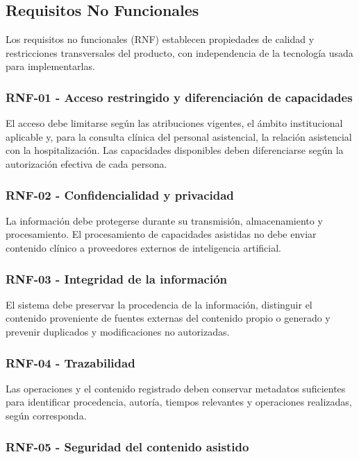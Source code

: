 \subsection{Requisitos No Funcionales}

Los requisitos no funcionales (RNF) establecen propiedades de calidad y restricciones transversales del producto, con independencia de la tecnología usada para implementarlas.

\subsubsection*{\textbf{RNF-01} - Acceso restringido y diferenciación de capacidades}

El acceso debe limitarse según las atribuciones vigentes, el ámbito institucional aplicable y, para la consulta clínica del personal asistencial, la relación asistencial con la hospitalización. Las capacidades disponibles deben diferenciarse según la autorización efectiva de cada persona.

\subsubsection*{\textbf{RNF-02} - Confidencialidad y privacidad}

La información debe protegerse durante su transmisión, almacenamiento y procesamiento. El procesamiento de capacidades asistidas no debe enviar contenido clínico a proveedores externos de inteligencia artificial.

\subsubsection*{\textbf{RNF-03} - Integridad de la información}

El sistema debe preservar la procedencia de la información, distinguir el contenido proveniente de fuentes externas del contenido propio o generado y prevenir duplicados y modificaciones no autorizadas.

\subsubsection*{\textbf{RNF-04} - Trazabilidad}

Las operaciones y el contenido registrado deben conservar metadatos suficientes para identificar procedencia, autoría, tiempos relevantes y operaciones realizadas, según corresponda.

\subsubsection*{\textbf{RNF-05} - Seguridad del contenido asistido}

